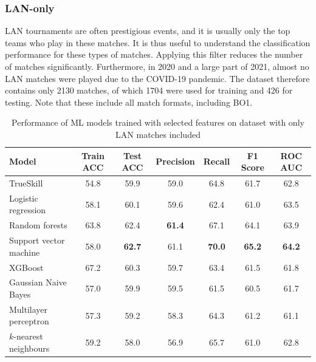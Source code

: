 \subsubsection{LAN-only}

LAN tournaments are often prestigious events, and it is usually only the top teams who play in these matches. It is thus useful to understand the classification performance for these types of matches. Applying this filter reduces the number of matches significantly. Furthermore, in 2020 and a large part of 2021, almost no LAN matches were played due to the COVID-19 pandemic. The dataset therefore contains only 2130 matches, of which 1704 were used for training and 426 for testing. Note that these include all match formats, including BO1. 

\begin{table}[h!]
	\centering
	\small
	\begin{adjustbox}{center} %
		\begin{tabular}{ |l|c|c|c|c|c|c| }
			\hline
			\rule{0pt}{2.6ex} \textbf{Model} & \textbf{Train ACC} & \textbf{Test ACC} & \textbf{Precision} & \textbf{Recall} & \textbf{F1 Score} & \textbf{ROC AUC} \\
			\hline
			\rule{0pt}{2.6ex} TrueSkill                 & 54.8 & 59.9 & 59.0 & 64.8 & 61.7 & 62.8 \\ \hline
			\rule{0pt}{2.6ex} Logistic regression       & 58.1 & 60.1 & 59.6 & 62.4 & 61.0 & 63.5 \\
			\rule{0pt}{2.6ex} Random forests            & 63.8 & 62.4 & \textbf{61.4} & 67.1 & 64.1 & 63.9 \\
			\rule{0pt}{2.6ex} Support vector machine    & 58.0 & \textbf{62.7} & 61.1 & \textbf{70.0} & \textbf{65.2} & \textbf{64.2} \\
			\rule{0pt}{2.6ex} XGBoost                   & 67.2 & 60.3 & 59.7 & 63.4 & 61.5 & 61.8 \\
			\rule{0pt}{2.6ex} Gaussian Naive Bayes      & 57.0 & 59.9 & 59.5 & 61.5 & 60.5 & 61.7 \\
			\rule{0pt}{2.6ex} Multilayer perceptron     & 57.3 & 59.2 & 58.3 & 64.3 & 61.2 & 61.1 \\
			\rule{0pt}{2.6ex} $k$-nearest neighbours 	& 59.2 & 58.0 & 56.9 & 65.7 & 61.0 & 62.8 \\
			\hline
		\end{tabular}
	\end{adjustbox}
	\caption{Performance of ML models trained with selected features on dataset with only LAN matches included}
	\label{table:0}
\end{table}

